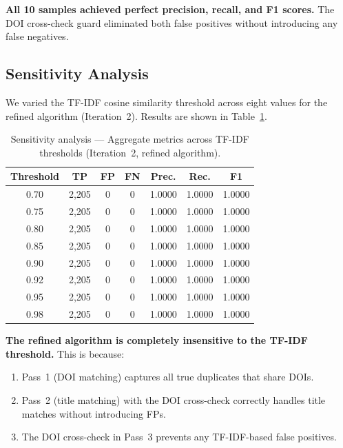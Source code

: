 \documentclass[conference]{IEEEtran}
\begin{document}
\textbf{All 10 samples achieved perfect precision, recall, and F1 scores.} The DOI cross-check guard eliminated both false positives without introducing any false negatives.

\subsection{Sensitivity Analysis}

We varied the TF-IDF cosine similarity threshold across eight values for the refined algorithm (Iteration~2). Results are shown in Table~\ref{tab:sensitivity}.

\begin{table}[htbp]
\centering
\caption{Sensitivity analysis --- Aggregate metrics across TF-IDF thresholds (Iteration~2, refined algorithm).}
\label{tab:sensitivity}
\begin{tabular}{@{}ccccccc@{}}
\toprule
\textbf{Threshold} & \textbf{TP} & \textbf{FP} & \textbf{FN} & \textbf{Prec.} & \textbf{Rec.} & \textbf{F1} \\
\midrule
0.70 & 2{,}205 & 0 & 0 & 1.0000 & 1.0000 & 1.0000 \\
0.75 & 2{,}205 & 0 & 0 & 1.0000 & 1.0000 & 1.0000 \\
0.80 & 2{,}205 & 0 & 0 & 1.0000 & 1.0000 & 1.0000 \\
0.85 & 2{,}205 & 0 & 0 & 1.0000 & 1.0000 & 1.0000 \\
0.90 & 2{,}205 & 0 & 0 & 1.0000 & 1.0000 & 1.0000 \\
0.92 & 2{,}205 & 0 & 0 & 1.0000 & 1.0000 & 1.0000 \\
0.95 & 2{,}205 & 0 & 0 & 1.0000 & 1.0000 & 1.0000 \\
0.98 & 2{,}205 & 0 & 0 & 1.0000 & 1.0000 & 1.0000 \\
\bottomrule
\end{tabular}
\end{table}

\textbf{The refined algorithm is completely insensitive to the TF-IDF threshold.} This is because:
\begin{enumerate}
    \item Pass~1 (DOI matching) captures all true duplicates that share DOIs.
    \item Pass~2 (title matching) with the DOI cross-check correctly handles title matches without introducing FPs.
    \item The DOI cross-check in Pass~3 prevents any TF-IDF-based false positives.
\end{enumerate}
\end{document}
